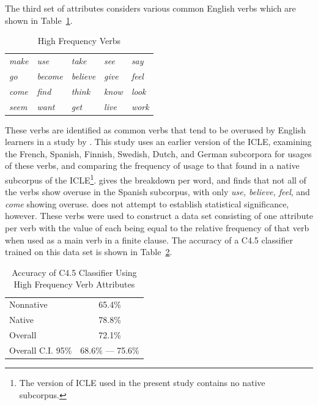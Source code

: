 \documentclass[main.tex]{subfiles}
\begin{document}
The third set of attributes considers various common English verbs which are shown in Table~\ref{table:high-freq-verbs}.
\begin{table}[htbp]
\centering
\caption{High Frequency Verbs}
\begin{tabular}{>{\itshape}l >{\itshape}l >{\itshape}l >{\itshape}l >{\itshape}l}
\toprule
make & use & take & see & say\\
go & become & believe & give & feel\\
come & find & think & know & look\\
seem & want & get & live & work\\
\bottomrule
\end{tabular}
\label{table:high-freq-verbs}
\end{table}
These verbs are identified as common verbs that tend to be overused by English learners in a study by \citet{ringbom:1998}. This study uses an earlier version of the ICLE, examining the French, Spanish, Finnish, Swedish, Dutch, and German subcorpora for usages of these verbs, and comparing the frequency of usage to that found in a native subcorpus of the ICLE\footnote{The version of ICLE used in the present study contains no native subcorpus.}. \citeauthor{ringbom:1998} gives the breakdown per word, and finds that not all of the verbs show overuse in the Spanish subcorpus, with only \textit{use, believe, feel}, and \textit{come} showing overuse. \citeauthor{ringbom:1998} does not attempt to establish statistical significance, however. These verbs were used to construct a data set consisting of one attribute per verb with the value of each being equal to the relative frequency of that verb when used as a main verb in a finite clause. The accuracy of a C4.5 classifier trained on this data set is shown in Table~\ref{table:high-freq-results}.
\begin{table}[htbp]
\centering
\caption{Accuracy of C4.5 Classifier Using High Frequency Verb Attributes}
\begin{tabular}{l c}
\toprule
Nonnative & 65.4\% \\
Native & 78.8\% \\
Overall & 72.1\% \\
Overall C.I. 95\% & 68.6\% --- 75.6\%\\
\bottomrule
\end{tabular}
\label{table:high-freq-results}
\end{table}
\end{document}
